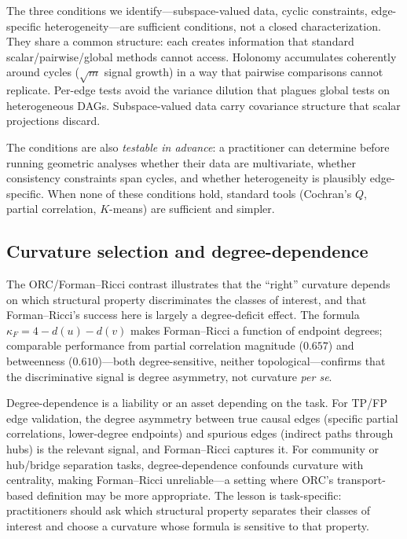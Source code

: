 \documentclass{article}
\begin{document}
The three conditions we identify---subspace-valued data, cyclic constraints, edge-specific heterogeneity---are sufficient conditions, not a closed characterization.
They share a common structure: each creates information that standard scalar/pairwise/global methods cannot access.
Holonomy accumulates coherently around cycles ($\sqrt{m}$ signal growth) in a way that pairwise comparisons cannot replicate.
Per-edge tests avoid the variance dilution that plagues global tests on heterogeneous DAGs.
Subspace-valued data carry covariance structure that scalar projections discard.

The conditions are also \emph{testable in advance}: a practitioner can determine before running geometric analyses whether their data are multivariate, whether consistency constraints span cycles, and whether heterogeneity is plausibly edge-specific.
When none of these conditions hold, standard tools (Cochran's $Q$, partial correlation, $K$-means) are sufficient and simpler.

\subsection{Curvature selection and degree-dependence}

The ORC/Forman--Ricci contrast illustrates that the ``right'' curvature depends on which structural property discriminates the classes of interest, and that Forman--Ricci's success here is largely a degree-deficit effect.
The formula $\kappa_F = 4 - d(u) - d(v)$ makes Forman--Ricci a function of endpoint degrees; comparable performance from partial correlation magnitude ($0.657$) and betweenness ($0.610$)---both degree-sensitive, neither topological---confirms that the discriminative signal is degree asymmetry, not curvature \emph{per se}.

Degree-dependence is a liability or an asset depending on the task.
For TP/FP edge validation, the degree asymmetry between true causal edges (specific partial correlations, lower-degree endpoints) and spurious edges (indirect paths through hubs) is the relevant signal, and Forman--Ricci captures it.
For community or hub/bridge separation tasks, degree-dependence confounds curvature with centrality, making Forman--Ricci unreliable---a setting where ORC's transport-based definition may be more appropriate.
The lesson is task-specific: practitioners should ask which structural property separates their classes of interest and choose a curvature whose formula is sensitive to that property.
\end{document}
